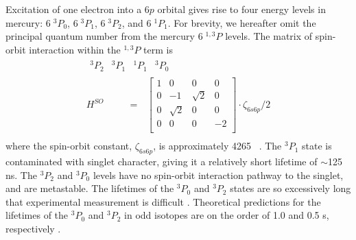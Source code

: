\documentclass[12pt]{mitthesis}
\begin{document}
Excitation of one electron into a $6p$ orbital gives rise to four
energy levels in mercury: $6 \; ^3P_0$, $6 \; ^3P_1$, $6 \; ^3P_2$,
and $6 \; ^1P_1$.  For brevity, we hereafter omit the principal
quantum number from the mercury $6 \; ^{1,3}P$ levels.  The matrix of
spin-orbit interaction within the $^{1,3}P$ term is
\begin{equation}
\begin{split}
 \begin{array}{cccc}^3P_2 & ^3P_1 & ^1P_1 & ^3P_0\end{array}\:\:\:\:\:\:\:\:\:\:\:\:\:\:\:\:\\
H^{SO} \:\:\:\:\:\:\:\:\:\:\: = \:\:\:
    \begin{bmatrix}
     1 & 0 & 0 & 0  \\
     0 & -1 & \sqrt{2} & 0 \\   
     0 & \sqrt{2} & 0 & 0 \\ 
     0 & 0 & 0 & -2 \\  
    \end{bmatrix}
  \cdot \zeta_{6s6p}/2\\
\end{split}
\end{equation}
where the spin-orbit constant, $\zeta_{6s6p}$, is approximately 4265
\rcm\ \cite{field04}.  The $^3P_1$ state is contaminated with singlet
character, giving it a relatively short lifetime of $\sim$125 ns.  The
$^3P_2$ and $^3P_0$ levels have no spin-orbit interaction pathway to
the singlet, and are metastable.  The lifetimes of the $^3P_0$ and
$^3P_2$ states are so excessively long that experimental measurement
is difficult \cite{wexler80}.  Theoretical predictions for the
lifetimes of the $^3P_0$ and $^3P_2$ in odd isotopes are on the order
of 1.0 and 0.5 s, respectively \cite{mishra01}.
\end{document}
